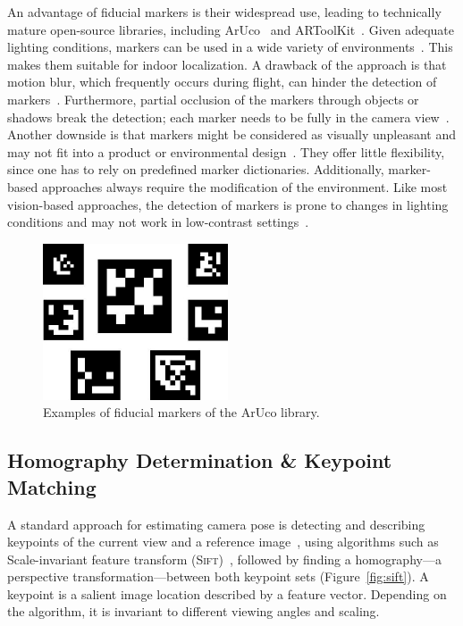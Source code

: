 \documentclass[11pt]{report}
\begin{document}
An advantage of fiducial markers is their widespread use, leading to
technically mature open-source libraries, including
ArUco~\cite{aruco2014} and ARToolKit~\cite{kato1999marker}. Given
adequate lighting conditions, markers can be used in a wide variety of
environments~\cite{hornecker2005using}. This makes them suitable for
indoor localization. A drawback of the approach is that motion blur,
which frequently occurs during flight, can hinder the detection of
markers~\cite{albasiouny2015mean}. Furthermore, partial occlusion of
the markers through objects or shadows break the detection; each
marker needs to be fully in the camera
view~\cite{hornecker2005using}. Another downside is that markers might
be considered as visually unpleasant and may not fit into a product or
environmental design~\cite{chu2013halftone}. They offer little
flexibility, since one has to rely on predefined marker
dictionaries. Additionally, marker-based approaches always require the
modification of the environment. Like most vision-based approaches,
the detection of markers is prone to changes in lighting conditions
and may not work in low-contrast settings~\cite{hornecker2005using}.



\begin{figure}[h!]
\begin{center}
\includegraphics[width=0.3\columnwidth]{markers}
\caption{{\label{fig:aruco}
Examples of fiducial markers of the ArUco library.%
}}
\end{center}
\end{figure}

\subsection{Homography Determination \& Keypoint Matching}
\label{sec:keypointmatching}

A standard approach for estimating camera pose is detecting and
describing keypoints of the current view and a reference
image~\cite{se2002global}, using algorithms such as Scale-invariant
feature transform (\textsc{Sift})~\cite{lowe1999object}, followed by
finding a homography---a perspective transformation---between both
keypoint sets (Figure~\ref{fig:sift}). A keypoint is a salient image
location described by a feature vector. Depending on the algorithm, it
is invariant to different viewing angles and scaling.
\end{document}
